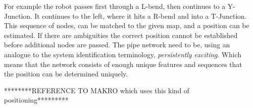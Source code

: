 For example the robot passes first through a L-bend, then continues to a Y-Junction. It
continues to the left, where it hits a R-bend and into a T-Junction. This sequence of
nodes, can be matched to the given map, and a position can be estimated. If there are
ambiguities the correct position cannot be established before additional nodes are passed.
The pipe network need to be, using an analogue to the system identification terminology, 
\emph{persistently exciting}. Which means that the network consists of enough unique features and
sequences that the position can be determined uniquely. 

********REFERENCE TO MAKRO which uses this kind of positioning*********

